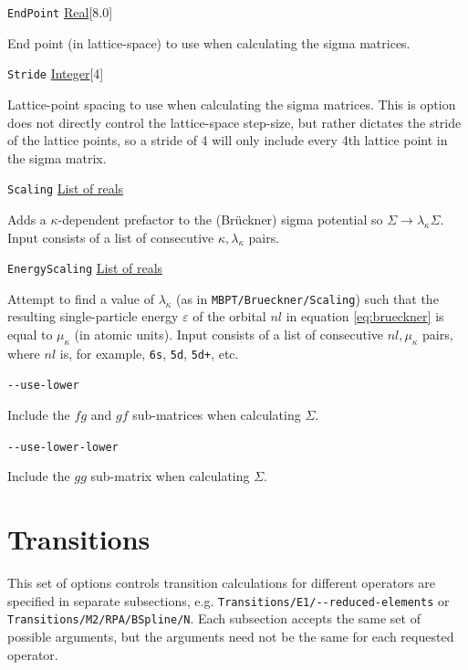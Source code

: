 \documentclass{report}
\begin{document}
\texttt{EndPoint} \uline{Real}[8.0]
\begin{adjustwidth}{1cm}{}
End point (in lattice-space) to use when calculating the sigma matrices.
\end{adjustwidth}

\texttt{Stride} \uline{Integer}[4]
\begin{adjustwidth}{1cm}{}
Lattice-point spacing to use when calculating the sigma matrices. This is option does not directly
control the lattice-space step-size, but rather dictates the stride of the lattice points, so a stride
of 4 will only include every 4th lattice point in the sigma matrix.
\end{adjustwidth}

\texttt{Scaling} \uline{List of reals}
\begin{adjustwidth}{1cm}{}
Adds a $\kappa$-dependent prefactor to the (Br\"{u}ckner) sigma potential so $\Sigma \to
\lambda_{\kappa}\Sigma$. Input consists of a list of consecutive $\kappa, \lambda_{\kappa}$ pairs.
\end{adjustwidth}

\texttt{EnergyScaling} \uline{List of reals}
\begin{adjustwidth}{1cm}{}
Attempt to find a value of $\lambda_{\kappa}$ (as in \texttt{MBPT/Brueckner/Scaling}) such that the resulting
single-particle energy $\varepsilon$ of the orbital $nl$ in equation \ref{eq:brueckner} is equal to $\mu_{\kappa}$ (in
atomic units). Input consists of a list of consecutive
$nl, \mu_{\kappa}$ pairs, where $nl$ is, for example, \texttt{6s}, \texttt{5d}, \texttt{5d+}, etc.
\end{adjustwidth}

\texttt{{-}{-}use-lower}
\begin{adjustwidth}{1cm}{}
Include the $fg$ and $gf$ sub-matrices when calculating $\Sigma$.
\end{adjustwidth}

\texttt{{-}{-}use-lower-lower}
\begin{adjustwidth}{1cm}{}
Include the $gg$ sub-matrix when calculating $\Sigma$.
\end{adjustwidth}

\section{Transitions}

This set of options controls transition calculations for different operators are specified in separate 
subsections, e.g. \texttt{Transitions/E1/{-}{-}reduced-elements} or 
\texttt{Transitions/M2/RPA/BSpline/N}. Each subsection accepts the same set 
of possible arguments, but the arguments need not be the same for each requested operator. 
\end{document}
